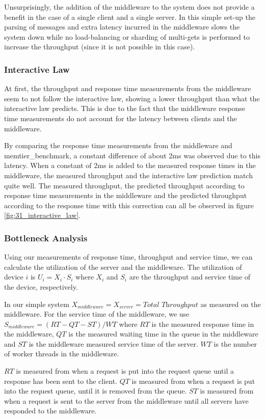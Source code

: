 \documentclass[11pt,a4paper]{article}
\begin{document}
Unsurprisingly, the addition of the middleware to the system does not provide a benefit in the case of a single client and a single server. In this simple set-up the parsing of messages and extra latency incurred in the middleware slows the system down while no load-balancing or sharding of multi-gets is performed to increase the throughput (since it is not possible in this case).

\subsubsection{Interactive Law}
At first, the throughput and response time measurements from the middleware seem to not follow the interactive law, showing a lower throughput than what the interactive law predicts. This is due to the fact that the middleware response time measurements do not account for the latency between clients and the middleware. 

By comparing the response time measurements from the middleware and memtier\_benchmark, a constant difference of about 2ms was observed due to this latency. When a constant of 2ms is added to the measured response times in the middleware, the measured throughput and the interactive law prediction match quite well. The measured throughput, the predicted throughput according to response time measurements in the middleware and the predicted throughput according to the response time with this correction can all be observed in figure \ref{fig:31_interactive_law}.

\subsubsection{Bottleneck Analysis}
Using our measurements of response time, throughput and service time, we can calculate the utilization of the server and the middleware. The utilization of device $i$ is $U_i = X_i \cdot S_i$ where $X_i$ and $S_i$ are the throughput and service time of the device, respectively.

In our simple system $X_{middleware} = X_{server} = \mathrm{\textit{Total\ Throughput}}$ as measured on the middleware. For the service time of the middleware, we use $S_{middleware} = (RT-QT-ST)/WT$ where $RT$ is the measured response time in the middleware, $QT$ is the measured waiting time in the queue in the middleware and $ST$ is the middleware measured service time of the server. $WT$ is the number of worker threads in the middleware.

$RT$ is measured from when a request is put into the request queue until a response has been sent to the client. $QT$ is measured from when a request is put into the request queue, until it is removed from the queue. $ST$ is measured from when a request is sent to the server from the middleware until all servers have responded to the middleware.
\end{document}
